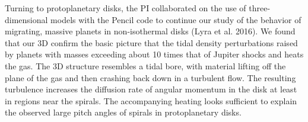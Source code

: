 \documentclass[12pt,preprint]{article}
\begin{document}
Turning to protoplanetary disks, the PI collaborated on the use of three-dimensional models with the Pencil code to continue our study of the behavior of migrating, massive planets in non-isothermal disks (Lyra et al. 2016).  We found that our 3D confirm the basic picture that  the tidal density perturbations raised by planets with masses exceeding about 10 times that of Jupiter shocks and  heats the gas. The 3D structure resembles a tidal bore, with material lifting off the plane of the gas and then crashing back down in a turbulent flow.  The resulting turbulence increases the diffusion rate of angular momentum in the disk at least in regions near the spirals. The accompanying heating looks sufficient to explain the observed large pitch angles of spirals in protoplanetary disks.
\end{document}

